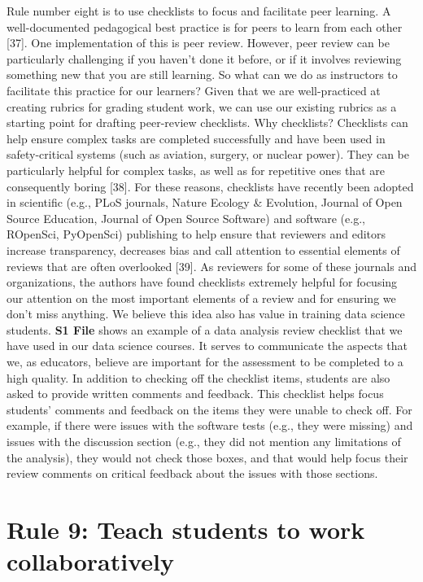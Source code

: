 \documentclass[
  10pt,
  letterpaper,
]{article}
\begin{document}
Rule number eight is to use checklists to focus and facilitate peer
learning. A well-documented pedagogical best practice is for peers to
learn from each other {[}37{]}. One implementation of this is peer
review. However, peer review can be particularly challenging if you
haven't done it before, or if it involves reviewing something new that
you are still learning. So what can we do as instructors to facilitate
this practice for our learners? Given that we are well-practiced at
creating rubrics for grading student work, we can use our existing
rubrics as a starting point for drafting peer-review checklists. Why
checklists? Checklists can help ensure complex tasks are completed
successfully and have been used in safety-critical systems (such as
aviation, surgery, or nuclear power). They can be particularly helpful
for complex tasks, as well as for repetitive ones that are consequently
boring {[}38{]}. For these reasons, checklists have recently been
adopted in scientific (e.g., PLoS journals, Nature Ecology \& Evolution,
Journal of Open Source Education, Journal of Open Source Software) and
software (e.g., ROpenSci, PyOpenSci) publishing to help ensure that
reviewers and editors increase transparency, decreases bias and call
attention to essential elements of reviews that are often overlooked
{[}39{]}. As reviewers for some of these journals and organizations, the
authors have found checklists extremely helpful for focusing our
attention on the most important elements of a review and for ensuring we
don't miss anything. We believe this idea also has value in training
data science students. \textbf{S1 File} shows an example of a data
analysis review checklist that we have used in our data science courses.
It serves to communicate the aspects that we, as educators, believe are
important for the assessment to be completed to a high quality. In
addition to checking off the checklist items, students are also asked to
provide written comments and feedback. This checklist helps focus
students' comments and feedback on the items they were unable to check
off. For example, if there were issues with the software tests (e.g.,
they were missing) and issues with the discussion section (e.g., they
did not mention any limitations of the analysis), they would not check
those boxes, and that would help focus their review comments on critical
feedback about the issues with those sections.

\section{Rule 9: Teach students to work
collaboratively}\label{sec-rule9}
\end{document}
